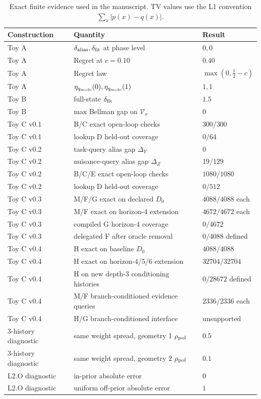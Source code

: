 \documentclass[10pt]{article}
\begin{document}
\begin{table}[H]
\centering
\caption{Exact finite evidence used in the manuscript. TV values use the L1 convention $\sum_x|p(x)-q(x)|$.}
\begin{tabular}{@{}lll@{}}
\toprule
Construction & Quantity & Result \\
\midrule
Toy A & $\delta_{\rm alias},\delta_{\rm fit}$ at phase level & $0,0$ \\
Toy A & Regret at $c=0.10$ & $0.40$ \\
Toy A & Regret law & $\max(0,\frac12-c)$ \\
Toy A & $\eta_{q_{\rm mode}}(0),\eta_{q_{\rm mode}}(1)$ & $1,1$ \\
Toy B & full-state $\delta_{\rm fit}$ & $1.5$ \\
Toy B & max Bellman gap on $\mathcal V_x$ & $0$ \\
Toy C v0.1 & B/C exact open-loop checks & $300/300$ \\
Toy C v0.1 & lookup D held-out coverage & $0/64$ \\
Toy C v0.2 & task-query alias gap $\Delta_Y$ & $0$ \\
Toy C v0.2 & nuisance-query alias gap $\Delta_Z$ & $19/129$ \\
Toy C v0.2 & B/C/E exact open-loop checks & $1080/1080$ \\
Toy C v0.2 & lookup D held-out coverage & $0/512$ \\
Toy C v0.3 & M/F/G exact on declared $D_0$ & $4088/4088$ each \\
Toy C v0.3 & M/F exact on horizon-4 extension & $4672/4672$ each \\
Toy C v0.3 & compiled G horizon-4 coverage & $0/4672$ \\
Toy C v0.3 & delegated F after oracle removal & $0/4088$ defined \\
Toy C v0.4 & H exact on baseline $D_0$ & $4088/4088$ \\
Toy C v0.4 & H exact on horizon-4/5/6 extension & $32704/32704$ \\
Toy C v0.4 & H on new depth-3 conditioning histories & $0/28672$ defined \\
Toy C v0.4 & M/F branch-conditioned evidence queries & $2336/2336$ each \\
Toy C v0.4 & H/G branch-conditioned interface & unsupported \\
3-history diagnostic & same weight spread, geometry 1 $\rho_{\rm pol}$ & $0.5$ \\
3-history diagnostic & same weight spread, geometry 2 $\rho_{\rm pol}$ & $0.1$ \\
L2.O diagnostic & in-prior absolute error & $0$ \\
L2.O diagnostic & uniform off-prior absolute error & $1$ \\
\bottomrule
\end{tabular}
\end{table}
\end{document}
